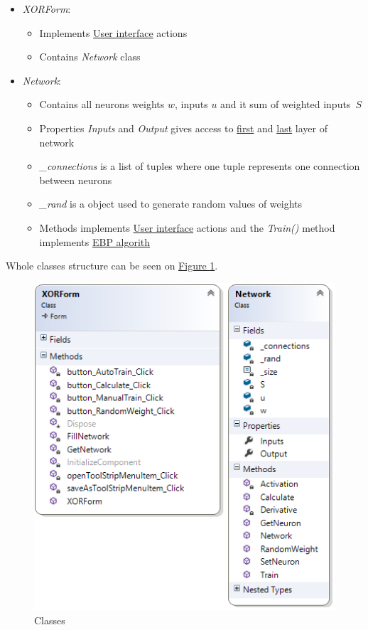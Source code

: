 \begin{itemize}[topsep=1pt,itemsep=-1ex,partopsep=1ex,parsep=1ex]
    \item \textit{XORForm}:
    \begin{itemize}[topsep=0pt,itemsep=-1ex,partopsep=1ex,parsep=1ex]
        \item Implements \hyperref[UserInterface]{User interface} actions
        \item Contains \textit{Network} class 
    \end{itemize}
    \item \textit{Network}:
    \begin{itemize}[topsep=0pt,itemsep=-1ex,partopsep=1ex,parsep=1ex]
        \item Contains all neurons weights $w$, inputs $u$ and it sum of weighted inputs~$S$
        \item Properties \textit{Inputs} and \textit{Output} gives access to \hyperref[InputLayer]{first} and \hyperref[OutputLayer]{last} layer of network
        \item \textit{\_connections} is a list of tuples where one tuple represents one connection between neurons
        \item \textit{\_rand} is a object used to generate random values of weights
        \item Methods implements \hyperref[UserInterface]{User interface} actions and the \textit{Train()} method implements \hyperref[formula:EBP]{EBP algorith}
    \end{itemize}
\end{itemize}

Whole classes structure can be seen on \hyperref[fig:Classes]{Figure \ref{fig:Classes}}.

\begin{figure}[!h]
    \centering
    \includegraphics[scale=1]{Media/Class.png}
    \caption{Classes}
    \label{fig:Classes}
\end{figure}

